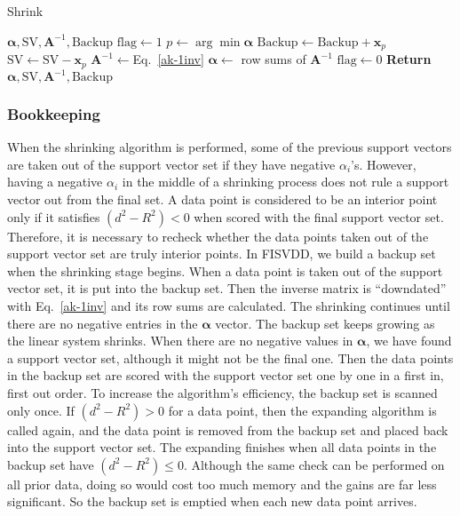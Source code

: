 \documentclass{article}
\newcommand{\eref}[1]{Eq.~\ref{#1}}
\numberwithin{equation}{section}
\begin{document}
\begin{algorithm}
\centering
\caption{Shrink}\label{shrink}
\begin{algorithmic}[1]
 {$\boldsymbol{\alpha},\mathrm{SV},\mathbf{A}^{-1},\mathrm{Backup}$}
\STATE $\mathrm{flag} \gets 1$
\STATE $p \gets \arg\min\boldsymbol{\alpha}$
\STATE $\mathrm{Backup} \gets \mathrm{Backup} + \mathbf{x}_p$
\STATE $\mathrm{SV} \gets \mathrm{SV} - \mathbf{x}_p$
\STATE $\mathbf{A}^{-1}\gets$\eref{ak-1inv} 
\STATE $\boldsymbol{\alpha}\gets$ row sums of $\mathbf{A}^{-1}$
        \STATE $\mathrm{flag} \gets 0$
\ENDIF
\ENDWHILE
\STATE \textbf{Return} {$\boldsymbol{\alpha},\mathrm{SV},\mathbf{A}^{-1},\mathrm{Backup}$}
\end{algorithmic}
\end{algorithm}


\subsubsection{Bookkeeping}
When the shrinking algorithm is performed, some of the previous support vectors are taken out of the support vector set if they have negative $\alpha_i$'s. However, having a negative $\alpha_i$ in the middle of a shrinking process does not rule a support vector out from the final set. A data point is considered to be an interior point only if it satisfies $(d^2-R^2)<0$ when scored with the final support vector set. Therefore, it is necessary to recheck whether the data points taken out of the support vector set are truly interior points. In FISVDD, we build a backup set when the shrinking stage begins. When a data point is taken out of the support vector set, it is put into the backup set. Then the inverse matrix is ``downdated'' with \eref{ak-1inv} and its row sums are calculated. The shrinking continues until there are no negative entries in the $\boldsymbol{\alpha}$ vector. The backup set keeps growing as the linear system shrinks. When there are no negative values in $\boldsymbol{\alpha}$, we have found a support vector set, although it might not be the final one. Then the data points in the backup set are scored with the support vector set one by one in a first in, first out order. To increase the algorithm's efficiency, the backup set is scanned only once. If $(d^2-R^2)>0$ for a data point, then the expanding algorithm is called again, and the data point is removed from the backup set and placed back into the support vector set. The expanding finishes when all data points in the backup set have $(d^2-R^2)\le0$. Although the same check can be performed on all prior data, doing so would cost too much memory and the gains are far less significant. So the backup set is emptied when each new data point arrives.
\end{document}
